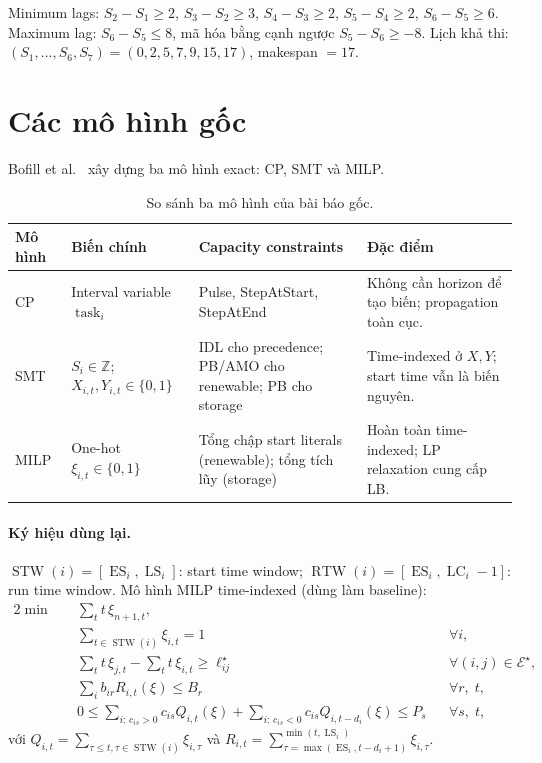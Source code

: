 \documentclass[11pt,a4paper]{article}
\theoremstyle{remark}
\newcommand{\ES}{\operatorname{ES}}
\newcommand{\LS}{\operatorname{LS}}
\newcommand{\LC}{\operatorname{LC}}
\newcommand{\STW}{\operatorname{STW}}
\newcommand{\RTW}{\operatorname{RTW}}
\begin{document}
Minimum lags: $S_2-S_1\ge2$, $S_3-S_2\ge3$, $S_4-S_3\ge2$,
$S_5-S_4\ge2$, $S_6-S_5\ge6$.
Maximum lag: $S_6-S_5\le8$, mã hóa bằng cạnh ngược $S_5-S_6\ge-8$.
Lịch khả thi: $(S_1,\ldots,S_6,S_7) = (0,2,5,7,9,15,17)$, makespan $= 17$.

\section{Các mô hình gốc}
\label{sec:original}

Bofill et al.~\cite{bofill2022samsp} xây dựng ba mô hình exact: CP, SMT và MILP.

\begin{table}[htbp]
\centering
\caption{So sánh ba mô hình của bài báo gốc.}
\label{tab:original}
\begin{tabularx}{\textwidth}{@{}p{}p{}Y Y@{}}
\toprule
\textbf{Mô hình} & \textbf{Biến chính} & \textbf{Capacity constraints} &
\textbf{Đặc điểm}\\
\midrule
CP   & Interval variable $\operatorname{task}_i$ &
  Pulse, StepAtStart, StepAtEnd &
  Không cần horizon để tạo biến; propagation toàn cục.\\
SMT  & $S_i \in \mathbb{Z}$; $X_{i,t}, Y_{i,t} \in \{0,1\}$ &
  IDL cho precedence; PB/AMO cho renewable; PB cho storage &
  Time-indexed ở $X,Y$; start time vẫn là biến nguyên.\\
MILP & One-hot $\xi_{i,t} \in \{0,1\}$ &
  Tổng chập start literals (renewable); tổng tích lũy (storage) &
  Hoàn toàn time-indexed; LP relaxation cung cấp LB.\\
\bottomrule
\end{tabularx}
\end{table}

\paragraph{Ký hiệu dùng lại.}
$\STW(i) = [\ES_i, \LS_i]$: start time window;
$\RTW(i) = [\ES_i, \LC_i - 1]$: run time window.
Mô hình MILP time-indexed (dùng làm baseline):
\begin{alignat}{2}
  \min\quad & \textstyle\sum_t t\,\xi_{n+1,t}, \tag{ILP-OBJ}\\
  & \textstyle\sum_{t \in \STW(i)} \xi_{i,t} = 1 && \forall i,
    \tag{ILP-EO}\label{ILP-EO}\\
  & \textstyle\sum_t t\,\xi_{j,t} - \sum_t t\,\xi_{i,t} \ge \ell^\star_{ij}
    && \forall (i,j) \in \mathcal{E}^\star, \tag{ILP-P}\\
  & \textstyle\sum_i b_{ir} R_{i,t}(\xi) \le B_r
    && \forall r,\;t, \tag{ILP-R}\\
  & \textstyle 0 \le \sum_{i:\,c_{is}>0} c_{is} Q_{i,t}(\xi)
    + \sum_{i:\,c_{is}<0} c_{is} Q_{i,t-d_i}(\xi) \le P_s
    && \forall s,\;t, \tag{ILP-C}
\end{alignat}
với $Q_{i,t} = \sum_{\tau \le t, \tau \in \STW(i)} \xi_{i,\tau}$ và
$R_{i,t} = \sum_{\tau=\max(\ES_i,t-d_i+1)}^{\min(t,\LS_i)} \xi_{i,\tau}$.
\end{document}
